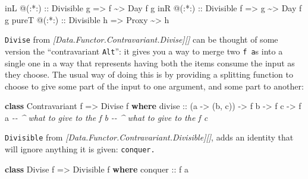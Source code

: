 \documentclass[]{article}
\newenvironment{Shaded}{}{}
\newcommand{\CommentTok}[1]{\textcolor[rgb]{0.38,0.63,0.69}{\textit{#1}}}
\newcommand{\DataTypeTok}[1]{\textcolor[rgb]{0.56,0.13,0.00}{#1}}
\newcommand{\KeywordTok}[1]{\textcolor[rgb]{0.00,0.44,0.13}{\textbf{#1}}}
\newcommand{\NormalTok}[1]{#1}
\newcommand{\OperatorTok}[1]{\textcolor[rgb]{0.40,0.40,0.40}{#1}}
\newcommand{\OtherTok}[1]{\textcolor[rgb]{0.00,0.44,0.13}{#1}}
\begin{document}
\begin{itemize}
\begin{Shaded}
\begin{Highlighting}[]
\NormalTok{inL   }\OperatorTok{@}\OtherTok{(:*:) ::} \DataTypeTok{Divisible}\NormalTok{ g }\OtherTok{=>}\NormalTok{ f     }\OperatorTok{\textasciitilde{}>} \DataTypeTok{Day}\NormalTok{ f g}
\NormalTok{inR   }\OperatorTok{@}\OtherTok{(:*:) ::} \DataTypeTok{Divisible}\NormalTok{ f }\OtherTok{=>}\NormalTok{ g     }\OperatorTok{\textasciitilde{}>} \DataTypeTok{Day}\NormalTok{ f g}
\NormalTok{pureT }\OperatorTok{@}\OtherTok{(:*:) ::} \DataTypeTok{Divisible}\NormalTok{ h }\OtherTok{=>} \DataTypeTok{Proxy} \OperatorTok{\textasciitilde{}>}\NormalTok{ h}
\end{Highlighting}
\end{Shaded}

  \texttt{Divise} from \emph{{[}Data.Functor.Contravariant.Divise{]}{[}{]}} can
  be thought of some version the ``contravariant \texttt{Alt}'': it gives you a
  way to merge two \texttt{f\ a}s into a single one in a way that represents
  having both the items consume the input as they choose. The usual way of doing
  this is by providing a splitting function to choose to give some part of the
  input to one argument, and some part to another:

\begin{Shaded}
\begin{Highlighting}[]
\KeywordTok{class} \DataTypeTok{Contravariant}\NormalTok{ f }\OtherTok{=>} \DataTypeTok{Divise}\NormalTok{ f }\KeywordTok{where}
\OtherTok{    divise ::}\NormalTok{ (a }\OtherTok{{-}>}\NormalTok{ (b, c)) }\OtherTok{{-}>}\NormalTok{ f b }\OtherTok{{-}>}\NormalTok{ f c }\OtherTok{{-}>}\NormalTok{ f a}
                  \CommentTok{{-}{-} \^{} what to give to the \textquotesingle{}f b\textquotesingle{}}
                     \CommentTok{{-}{-} \^{} what to give to the \textquotesingle{}f c\textquotesingle{}}
\end{Highlighting}
\end{Shaded}

  \texttt{Divisible} from
  \emph{{[}Data.Functor.Contravariant.Divisible{]}{[}{]}}, adds an identity that
  will ignore anything it is given: \texttt{conquer.}

\begin{Shaded}
\begin{Highlighting}[]
\KeywordTok{class} \DataTypeTok{Divise}\NormalTok{ f }\OtherTok{=>} \DataTypeTok{Divisible}\NormalTok{ f }\KeywordTok{where}
\OtherTok{    conquer ::}\NormalTok{ f a}
\end{Highlighting}
\end{Shaded}


\end{itemize}
\end{document}
